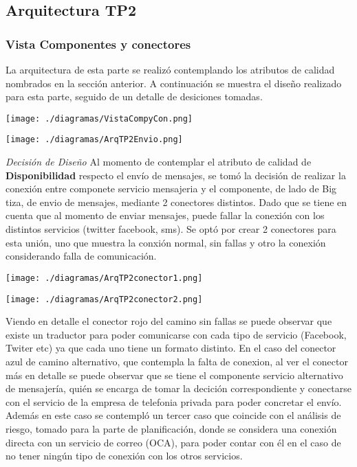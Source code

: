 \documentclass[a4paper, 11pt]{article}
\begin{document}
\subsection{Arquitectura TP2}
\subsubsection{Vista Componentes y conectores}
La arquitectura de esta parte se realizó contemplando los atributos de calidad nombrados en la sección anterior. A continuación se muestra el diseño realizado para esta parte, seguido de un detalle de desiciones tomadas.

\centerline{\texttt{[image: ./diagramas/VistaCompyCon.png]}}
\centerline{\texttt{[image: ./diagramas/ArqTP2Envio.png]}}

\emph{Decisión de Diseño} Al momento de contemplar el atributo de calidad de \textbf{Disponibilidad} respecto el envío de mensajes, se tomó la decisión de realizar la conexión entre componete servicio mensajeria  y el componente, de lado de Big tiza, de envio de mensajes, mediante 2 conectores distintos. Dado que se tiene en cuenta que al momento  de enviar mensajes, puede fallar la conexión con los distintos servicios (twitter facebook, sms). 
Se optó por crear 2 conectores para esta unión, uno que muestra la conxión normal, sin fallas y otro la conexión considerando falla de comunicación.\\

\centerline{\texttt{[image: ./diagramas/ArqTP2conector1.png]}}
\centerline{\texttt{[image: ./diagramas/ArqTP2conector2.png]}}

Viendo en detalle el conector rojo del camino sin fallas se puede observar que existe un traductor para poder comunicarse con cada tipo de servicio (Facebook, Twiter etc) ya que cada uno tiene un formato distinto.
En el caso del conector azul de camino alternativo, que contempla la falta de conexion, al ver el conector más en detalle se puede observar  que se tiene el componente servicio alternativo de mensajería, quién se encarga de tomar la decición correspondiente y conectarse con el servicio de la empresa de telefonia privada para poder concretar el envío.\\

Además en este caso se contempló un tercer caso que coincide con el análisis de riesgo, tomado para la parte de planificación, donde se considera una conexión directa con un servicio de correo (OCA), para poder contar con él en el caso de no tener ningún tipo de conexión con los otros servicios.\\ %
\end{document}
